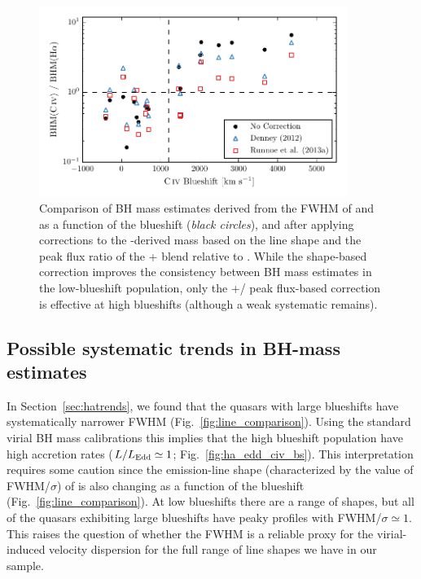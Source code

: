 \begin{figure}
	\includegraphics[width=10cm]{figures/chapter02/corrections.pdf}
    \caption{Comparison of BH mass estimates derived from the FWHM of  and \ha as a function of the  blueshift (\textit{black circles}), and after applying corrections to the -derived mass based on the line shape \citep[\textit{blue triangles};][]{denney12} and the peak flux ratio of the + blend relative to  \citep[\textit{red squares};][]{runnoe13}. While the shape-based correction improves the consistency between BH mass estimates in the low-blueshift population, only the +/ peak flux-based correction is effective at high blueshifts (although a weak systematic remains).}
    \label{fig:corrections}
\end{figure}

\subsection{Possible systematic trends in \ha BH-mass estimates}

In Section~\ref{sec:hatrends}, we found that the quasars with large  blueshifts have systematically narrower \ha FWHM (Fig.~\ref{fig:line_comparison}).
Using the standard virial BH mass calibrations this implies that the high  blueshift population have high accretion rates ($L/L_{\rm Edd} \simeq 1$; Fig.~\ref{fig:ha_edd_civ_bs}). 
This interpretation requires some caution since the emission-line shape (characterized by the value of FWHM/$\sigma$) of \ha is also changing as a function of the  blueshift (Fig.~\ref{fig:line_comparison}). 
At low  blueshifts there are a range of shapes, but all of the quasars exhibiting large  blueshifts have peaky \ha profiles with FWHM/$\sigma \simeq 1$. 
This raises the question of whether the \ha FWHM is a reliable proxy for the virial-induced velocity dispersion for the full range of \ha line shapes we have in our sample. 

